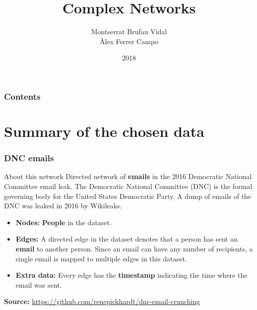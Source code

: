 \documentclass{beamer}
\title[]{Complex Networks}
\author[]{Montserrat Brufau Vidal\\ Àlex Ferrer Campo}
\institute[]{Universitat de Barcelona}
\date{2018}
\theoremstyle{plain}
\theoremstyle{definition}
\theoremstyle{remark}
\begin{document}
\begin{frame}
\titlepage
\end{frame}

\begin{frame}
\frametitle{Contents}
\tableofcontents
\end{frame}


\section{Summary of the chosen data}


\begin{frame}
\frametitle{DNC emails}
\begin{block}{About this network}
	Directed network of \textbf{emails} in the 2016 Democratic National Committee email leak. The Democratic National Committee (DNC) is the formal governing body for the United States Democratic Party. A dump of emails of the DNC was leaked in 2016 by Wikileaks. 
\end{block}
\pause
\begin{itemize}
	\item \textbf{Nodes:} \textbf{People} in the dataset.
	\pause
	\item \textbf{Edges:} A directed edge in the dataset denotes that a person has sent an \textbf{email} to another person. Since an email can have any number of recipients, a single email is mapped to multiple edges in this dataset.
	\pause
	\item \textbf{Extra data:} Every edge has the \textbf{timestamp} indicating the time where the email was sent.
\end{itemize}
\textbf{Source:} \href{https://github.com/renepickhardt/dnc-email-crunching}{https://github.com/renepickhardt/dnc-email-crunching}

\end{frame}

\end{document}
